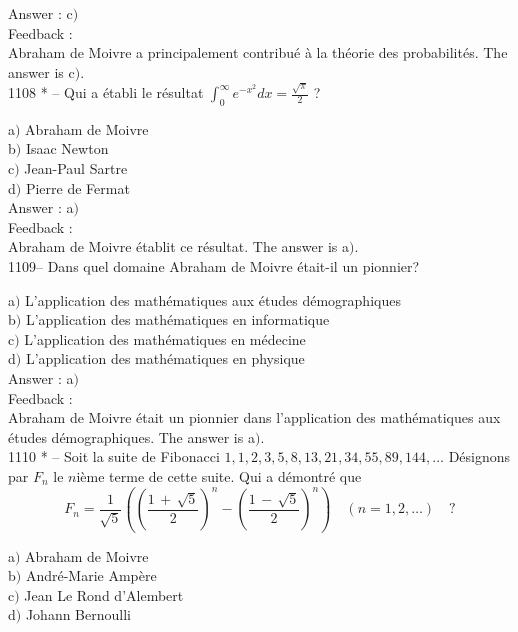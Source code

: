 ﻿\documentclass[letterpaper, 12pt]{article}
\begin{document}
Answer : c$)$\\

Feedback :\\
Abraham de Moivre a principalement contribu\'e \`a la th\'eorie des
probabilit\'es.
The answer is c$)$.\\

1108 * -- Qui a \'etabli le r\'esultat
$\displaystyle{\int_0^{\infty}e^{-x^2}dx=\frac{\sqrt{\pi}}2}$ ?

a$)$ Abraham de Moivre  \\
b$)$ Isaac Newton \\
c$)$ Jean-Paul Sartre  \\
d$)$ Pierre de Fermat\\

Answer : a$)$\\

Feedback :\\
Abraham de Moivre \'etablit ce r\'esultat.
The answer is a$)$.\\

1109-- Dans quel domaine Abraham de Moivre \'etait-il un pionnier?

a$)$ L'application des math\'ematiques aux \'etudes d\'emographiques  \\
b$)$ L'application des math\'ematiques en informatique \\
c$)$ L'application des math\'ematiques en m\'edecine  \\
d$)$ L'application des math\'ematiques en physique\\

Answer : a$)$\\

Feedback :\\
Abraham de Moivre \'etait un pionnier dans l'application des
math\'ematiques aux \'etudes d\'emographiques.
The answer is a$)$.\\

1110 * -- Soit la suite de Fibonacci
$1,1,2,3,5,8,13,21,34,55,89,144, \ldots$ D\'esignons par $F_n$ le
$n$i\`eme terme de cette suite. Qui a d\'emontr\'e que
$$\displaystyle{F_n=\frac1{\sqrt5}\left(\left(\frac{1\,+\,\sqrt5}2\right)^n-\left(\frac{1\,-\,\sqrt5}2\right)^n\right)\quad(n=1,2,\ldots)}\quad?$$

a$)$ Abraham de Moivre \\
b$)$ Andr\'e-Marie Amp\`ere \\
c$)$ Jean Le Rond d'Alembert  \\
d$)$ Johann Bernoulli\\
\end{document}
